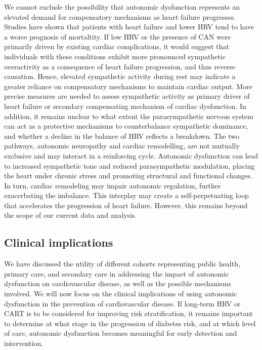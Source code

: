 \documentclass[
  a4paper,
  headsepline=true,
  open=any]{scrbook}
\begin{document}
We cannot exclude the possibility that autonomic dysfunction represents
an elevated demand for compensatory mechanisms as heart failure
progresses. Studies have shown that patients with heart failure and
lower HRV tend to have a worse prognosis of mortaltity. If low HRV or
the presence of CAN were primarily driven by existing cardiac
complications, it would suggest that individuals with these conditions
exhibit more pronounced sympathetic overactivity as a consequence of
heart failure progression, and thus reverse causation. Hence, elevated
sympathetic activity during rest may indicate a greater reliance on
compensatory mechanisms to maintain cardiac output. More precise
measures are needed to assess sympathetic activity as primary driver of
heart failure or secondary compensating mechanism of cardiac
dysfunction. In addition, it remains unclear to what extent the
parasympathetic nervous system can act as a protective mechanisms to
counterbalance sympathetic dominance, and whether a decline in the
balance of HRV reflects a breakdown. The two pathways, autonomic
neuropathy and cardiac remodelling, are not mutually exclusive and may
interact in a reinforcing cycle. Autonomic dysfunction can lead to
increased sympathetic tone and reduced parasympathetic modulation,
placing the heart under chronic stress and promoting structural and
functional changes. In turn, cardiac remodeling may impair autonomic
regulation, further exacerbating the imbalance. This interplay may
create a self-perpetuating loop that accelerates the progression of
heart failure. However, this remains beyond the scope of our current
data and analysis.

\hypertarget{clinical-implications}{%
\subsection{Clinical implications}\label{clinical-implications}}

We have discussed the utility of different cohorts representing public
health, primary care, and secondary care in addressing the impact of
autonomic dysfunction on cardiovascular disease, as well as the possible
mechanisms involved. We will now focus on the clinical implications of
using autonomic dysfunction in the prevention of cardiovascular disease.
If long-term HRV or CART is to be considered for improving risk
stratification, it remains important to determine at what stage in the
progression of diabetes risk, and at which level of care, autonomic
dysfunction becomes meaningful for early detection and intervention.
\end{document}
